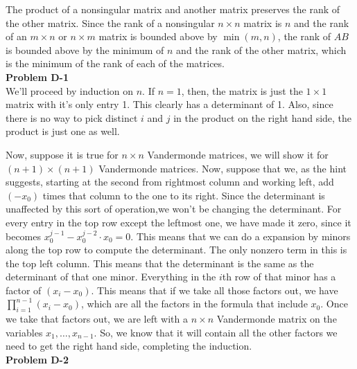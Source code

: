 \documentclass{article}
\begin{document}
The product of a nonsingular matrix and another matrix preserves the rank of the other matrix.  Since the rank of a nonsingular $n \times n$ matrix is $n$ and the rank of an $m \times n$ or $n \times m$ matrix is bounded above by $\min(m,n)$, the rank of $AB$ is bounded above by the minimum of $n$ and the rank of the other matrix, which is the minimum of the rank of each of the matrices.  \\

\noindent\textbf{Problem D-1}\\
We'll proceed by induction on $n$. If $n=1$, then, the matrix is just the $1\times 1$ matrix with it's only entry 1. This clearly has a determinant of 1. Also, since there is no way to pick distinct $i$ and $j$ in the product on the right hand side, the product is just one as well.

Now, suppose it is true for $n\times n$ Vandermonde matrices, we will show it for $(n+1)\times(n+1)$ Vandermonde matrices. Now, suppose that we, as the hint suggests, starting at the second from rightmost column and working left, add $(-x_0)$ times that column to the one to its right. Since the determinant is unaffected by this sort of operation,we won't be changing the determinant. For every entry in the top row except the leftmost one, we have made it zero, since it becomes $x_0^{j-1} - x_0^{j-2} \cdot x_0 =0$. This means that we can do a expansion by minors along the top row to compute the determinant. The only nonzero term in this is the top left column. This means that the determinant is the same as the determinant of that one minor. Everything in the $i$th row of that minor has a factor of $(x_i -x_0)$. This means that if we take all those factors out, we have $\prod_{i=1}^{n-1} (x_i - x_0)$, which are all the factors in the formula that include $x_0$. Once we take that factors out, we are left with a $n\times n$ Vandermonde matrix on the variables $x_1, \ldots, x_{n-1}$. So, we know that it will contain all the other factors we need to get the right hand side, completing the induction.\\

\noindent\textbf{Problem D-2}\\
\end{document}
